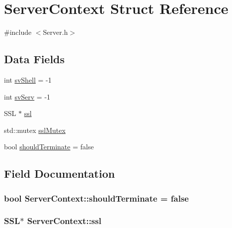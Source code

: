 \hypertarget{structServerContext}{}\section{Server\+Context Struct Reference}
\label{structServerContext}


{\ttfamily \#include $<$Server.\+h$>$}

\subsection*{Data Fields}
\begin{DoxyCompactItemize}
\item 
int \hyperlink{structServerContext_a2d08d74a2daaedabbcce115bdf8f05fa}{sv\+Shell} = -\/1
\item 
int \hyperlink{structServerContext_a728b751fab25a3042eb9e6b668bc9fb3}{sv\+Serv} = -\/1
\item 
S\+SL $\ast$ \hyperlink{structServerContext_a8ae67e20dfa22be8e22d03e7ea195113}{ssl}
\item 
std\+::mutex \hyperlink{structServerContext_adaf5a8ecb1b63b5dd2b932260fb99145}{ssl\+Mutex}
\item 
bool \hyperlink{structServerContext_a66fa302afc00b08a437e23858d5c371f}{should\+Terminate} = false
\end{DoxyCompactItemize}


\subsection{Field Documentation}
\subsubsection[{\texorpdfstring{should\+Terminate}{shouldTerminate}}]{\setlength{\rightskip}{0pt plus 5cm}bool Server\+Context\+::should\+Terminate = false}\hypertarget{structServerContext_a66fa302afc00b08a437e23858d5c371f}{}\label{structServerContext_a66fa302afc00b08a437e23858d5c371f}
\subsubsection[{\texorpdfstring{ssl}{ssl}}]{\setlength{\rightskip}{0pt plus 5cm}S\+SL$\ast$ Server\+Context\+::ssl}\hypertarget{structServerContext_a8ae67e20dfa22be8e22d03e7ea195113}{}\label{structServerContext_a8ae67e20dfa22be8e22d03e7ea195113}
